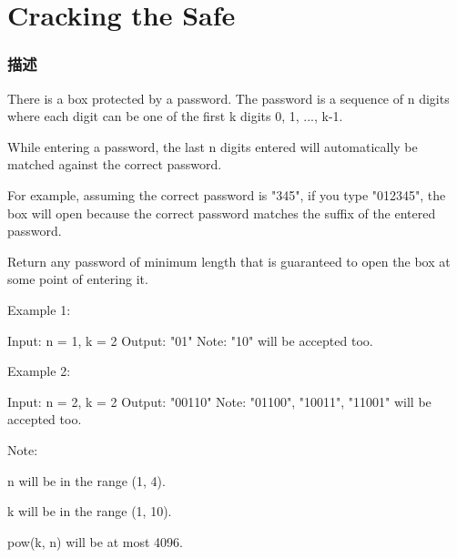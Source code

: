 \section{Cracking the Safe} %
\label{sec:cracking-the-safe}


\subsubsection{描述}
There is a box protected by a password. The password is a sequence of n digits where each digit can be one of the first k digits 0, 1, ..., k-1.

While entering a password, the last n digits entered will automatically be matched against the correct password.

For example, assuming the correct password is "345", if you type "012345", the box will open because the correct password matches the suffix of the entered password.

Return any password of minimum length that is guaranteed to open the box at some point of entering it.

Example 1:
\begin{Code}
Input: n = 1, k = 2
Output: "01"
Note: "10" will be accepted too.
\end{Code}

Example 2:
\begin{Code}
Input: n = 2, k = 2
Output: "00110"
Note: "01100", "10011", "11001" will be accepted too.
\end{Code}

Note:
\begindot
\item n will be in the range (1, 4).
\item k will be in the range (1, 10).
\item pow(k, n) will be at most 4096.
\myenddot

